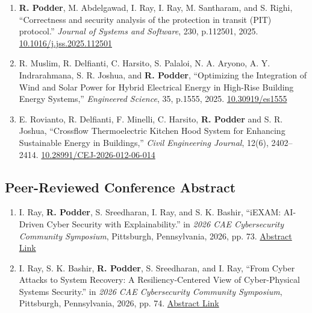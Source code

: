 \documentclass[11pt, a4paper]{article}
\begin{document}
\begin{enumerate}[leftmargin=*, label=\arabic*., itemsep=4pt, topsep=2pt]

\item \textbf{\color{cvred}R. Podder}, M. Abdelgawad, I. Ray, I. Ray, M. Santharam, and S. Righi, ``Correctness and security analysis of the protection in transit (PIT) protocol.'' \textit{Journal of Systems and Software}, 230, p.112501, 2025. \href{https://doi.org/10.1016/j.jss.2025.112501}{\color{cvgray}10.1016/j.jss.2025.112501}

\item R. Muslim, R. Delfianti, C. Harsito, S. Palaloi, N. A. Aryono, A. Y. Indrarahmana, S. R. Joshua, and \textbf{\color{cvred}R. Podder}, ``Optimizing the Integration of Wind and Solar Power for Hybrid Electrical Energy in High-Rise Building Energy Systems,'' \textit{ Engineered Science}, 35, p.1555, 2025. \href{http://dx.doi.org/10.30919/es1555}{\color{cvgray}10.30919/es1555}

\item E. Rovianto, R. Delfianti, F. Minelli, C. Harsito, \textbf{\color{cvred}R. Podder} and S. R. Joshua, ``Crossflow Thermoelectric Kitchen Hood System for Enhancing Sustainable Energy in Buildings,'' \textit{Civil Engineering Journal},  12(6), 2402–2414. \href{https://doi.org/10.28991/CEJ-2026-012-06-014}{\color{cvgray}10.28991/CEJ-2026-012-06-014}

\end{enumerate}

\subsection{\color{cvred}Peer-Reviewed Conference Abstract}

\begin{enumerate}[leftmargin=*, label=\arabic*., itemsep=4pt, topsep=2pt]

\item I. Ray, \textbf{\color{cvred}R. Podder}, S. Sreedharan, I. Ray, and S. K. Bashir, ``iEXAM: AI-Driven Cyber Security with Explainability.'' in \textit{2026 CAE Cybersecurity Community Symposium}, Pittsburgh, Pennsylvania, 2026, pp. 73. \href{https://8505d155-f364-4b90-865e-959b0628f5da.usrfiles.com/ugd/8505d1_9e45d49080d142ae941ae6fdac82b871.pdf}{Abstract Link}

\item I. Ray, S. K. Bashir, \textbf{\color{cvred}R. Podder}, S. Sreedharan, and I. Ray, ``From Cyber Attacks to System Recovery:
A Resiliency-Centered View of Cyber-Physical Systems Security.'' in \textit{2026 CAE Cybersecurity Community Symposium}, Pittsburgh, Pennsylvania, 2026, pp. 74. \href{https://8505d155-f364-4b90-865e-959b0628f5da.usrfiles.com/ugd/8505d1_9e45d49080d142ae941ae6fdac82b871.pdf}{Abstract Link}

\end{enumerate}
\end{document}
